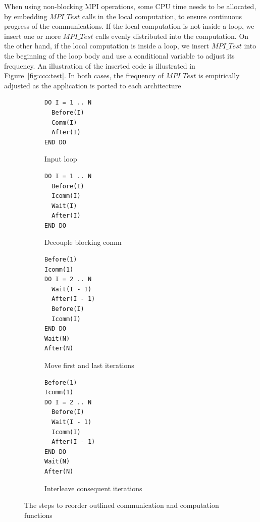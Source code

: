 When using non-blocking MPI operations, some CPU time needs to be allocated, by embedding $MPI\_Test$ calls in the local computation,
to ensure continuous progress of the communications.
If the local computation is not inside a loop, we insert one or more $MPI\_Test$ calls evenly distributed into the computation.
On the other hand, if the local computation is inside a loop,
  we insert $MPI\_Test$ into the beginning of the loop body and use a conditional variable to adjust its frequency.
An illustration of the inserted code is illustrated in Figure~\ref{fig:cco:test}.
In both cases, the frequency of $MPI\_Test$ is empirically adjusted as the application is ported to each architecture


\begin{figure}
{\scriptsize
  \centering
  \begin{subfigure}[b]{.25\textwidth}
\begin{verbatim}
DO I = 1 .. N
  Before(I)
  Comm(I)
  After(I)
END DO
\end{verbatim}
    \caption{Input loop}
    \label{fig:cco:reorder:a}
    \vspace{.1in}
  \end{subfigure}%
  \begin{subfigure}[b]{.25\textwidth}
\begin{verbatim}
DO I = 1 .. N
  Before(I)
  Icomm(I)
  Wait(I)
  After(I)
END DO
\end{verbatim}
    \caption{Decouple blocking comm}%
    \label{fig:cco:reorder:b}
    \vspace{.1in}
  \end{subfigure}
  \begin{subfigure}[b]{.25\textwidth}
\begin{verbatim}
Before(1)
Icomm(1)
DO I = 2 .. N
  Wait(I - 1)
  After(I - 1)
  Before(I)
  Icomm(I)
END DO
Wait(N)
After(N)
\end{verbatim}
    \caption{Move first and last iterations}
    \label{fig:cco:reorder:c}
  \end{subfigure}%
  \begin{subfigure}[b]{.25\textwidth}
\begin{verbatim}
Before(1)
Icomm(1)
DO I = 2 .. N
  Before(I)
  Wait(I - 1)
  Icomm(I)
  After(I - 1)
END DO
Wait(N)
After(N)
\end{verbatim}
    \caption{Interleave consequent iterations}
    \label{fig:cco:reorder:d}
  \end{subfigure}
\caption{The steps to reorder outlined communication and computation functions}
\label{fig:cco:reorder}
}%
\end{figure}


